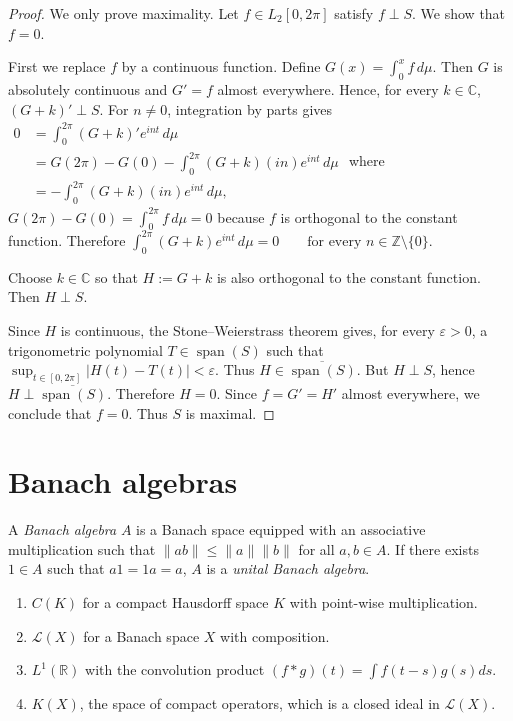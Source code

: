 \begin{proof}
We only prove maximality. Let
$f\in L_2[0,2\pi]$ satisfy
$
f\perp S.
$
We show that $f=0$.

First we replace $f$ by a continuous
function. Define
$
G(x)=\int_0^x f\,d\mu.
$
Then $G$ is absolutely continuous and
$G'=f$ almost everywhere. Hence, for every
$k\in\mathbb C$,
$
(G+k)'\perp S.
$
For $n\neq0$, integration by parts gives
$
\begin{aligned}
0
&=\int_0^{2\pi}(G+k)'e^{int}\,d\mu\\
&=G(2\pi)-G(0)
 -\int_0^{2\pi}(G+k)(in)e^{int}\,d\mu\\
&=-\int_0^{2\pi}(G+k)(in)e^{int}\,d\mu,
\end{aligned}
$
where $G(2\pi)-G(0)=\int_0^{2\pi}f\,d\mu=0$
because $f$ is orthogonal to the constant
function. Therefore
$
\int_0^{2\pi}(G+k)e^{int}\,d\mu=0
\qquad
\text{for every }n\in\mathbb Z\setminus
\{0\}.
$

Choose $k\in\mathbb C$ so that
$
H:=G+k
$
is also orthogonal to the constant function.
Then $H\perp S$.

Since $H$ is continuous, the
Stone--Weierstrass theorem gives, for every
$\varepsilon>0$, a trigonometric polynomial
$T\in\operatorname{span}(S)$ such that
$
\sup_{t\in[0,2\pi]}|H(t)-T(t)|
<\varepsilon.
$
Thus
$
H\in\overline{\operatorname{span}(S)}.
$
But $H\perp S$, hence
$H\perp\overline{\operatorname{span}(S)}$.
Therefore $H=0$. Since
$
f=G'=H'
$
almost everywhere, we conclude that $f=0$.
Thus $S$ is maximal.
\end{proof}

\section{Banach algebras}
\label{section-banach-algebras}

\begin{definition}
\label{definition-banach-algebra}
A {\it Banach algebra} $A$ is a Banach space
equipped with an associative multiplication
such that $\|ab\| \leq \|a\| \|b\|$ for all
$a, b \in A$. If there exists $1 \in A$ such
that $a1 = 1a = a$, $A$ is a {\it unital
Banach algebra}.
\end{definition}

\begin{example}
\label{example-banach-algebras}
\begin{enumerate}
\item $C(K)$ for a compact Hausdorff space
$K$ with point-wise multiplication.
\item $\mathcal{L}(X)$ for a Banach space $X$
with composition.
\item $L^1(\mathbb{R})$ with the convolution
product $(f \ast g)(t) = \int f(t-s)g(s) ds$.
\item $K(X)$, the space of compact operators,
which is a closed ideal in $\mathcal{L}(X)$.
\end{enumerate}
\end{example}

